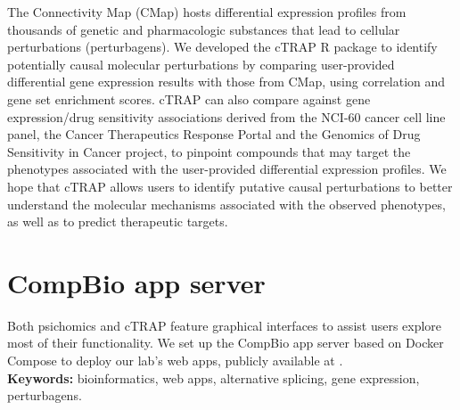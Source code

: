 The Connectivity Map (CMap) hosts differential expression profiles from thousands of genetic and pharmacologic substances that lead to cellular perturbations (perturbagens). We developed the cTRAP R package to identify potentially causal molecular perturbations by comparing user-provided differential gene expression results with those from CMap, using correlation and gene set enrichment scores. cTRAP can also compare against gene expression/drug sensitivity associations derived from the NCI-60 cancer cell line panel, the Cancer Therapeutics Response Portal and the Genomics of Drug Sensitivity in Cancer project, to pinpoint compounds that may target the phenotypes associated with the user-provided differential expression profiles. We hope that cTRAP allows users to identify putative causal perturbations to better understand the molecular mechanisms associated with the observed phenotypes, as well as to predict therapeutic targets.

\section*{CompBio app server}

Both psichomics and cTRAP feature graphical interfaces to assist users explore most of their functionality. We set up the CompBio app server based on Docker Compose to deploy our lab's web apps, publicly available at .\\

\textbf{Keywords:} bioinformatics, web apps, alternative splicing, gene expression, perturbagens.

